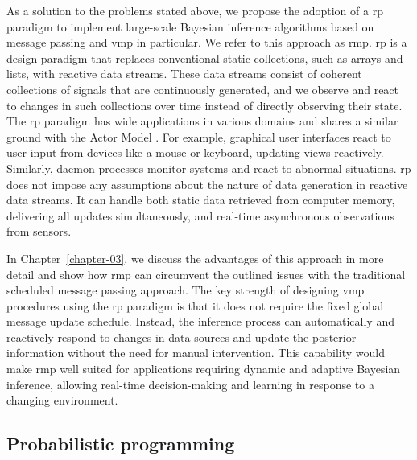 
As a solution to the problems stated above, we propose the adoption of a \ac{rp} paradigm to implement large-scale Bayesian inference algorithms based on message passing and \ac{vmp} in particular. We refer to this approach as \ac{rmp}. \ac{rp} is a design paradigm that replaces conventional static collections, such as arrays and lists, with reactive data streams. These data streams consist of coherent collections of signals that are continuously generated, and we observe and react to changes in such collections over time instead of directly observing their state. 
The \ac{rp} paradigm has wide applications in various domains and shares a similar ground with the Actor Model \citep{hewitt_actor_model}. For example, graphical user interfaces react to user input from devices like a mouse or keyboard, updating views reactively. Similarly, daemon processes monitor systems and react to abnormal situations. \Ac{rp} does not impose any assumptions about the nature of data generation in reactive data streams. It can handle both static data retrieved from computer memory, delivering all updates simultaneously, and real-time asynchronous observations from sensors. 

In Chapter~\ref{chapter-03}, we discuss the advantages of this approach in more detail and show how \ac{rmp} can circumvent the outlined issues with the traditional scheduled message passing approach. 
The key strength of designing \ac{vmp} procedures using the \ac{rp} paradigm is that it does not require the fixed global message update schedule. Instead, the inference process can automatically and reactively respond to changes in data sources and update the posterior information without the need for manual intervention. This capability would make \ac{rmp} well suited for applications requiring dynamic and adaptive Bayesian inference, allowing real-time decision-making and learning in response to a changing environment.

\subsection{Probabilistic programming}

